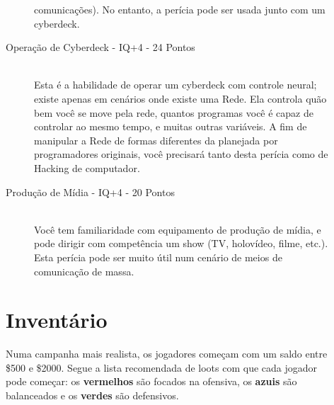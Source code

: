 \documentclass[a4paper]{article}
\begin{document}
\begin{description}
\begin{description}
comunicações). No entanto, a perícia pode ser usada junto com um cyberdeck.
    \item[Operação de Cyberdeck - IQ+4 - 24 Pontos] \hfill \\ Esta é a habilidade de operar um cyberdeck com controle
neural; existe apenas em cenários onde existe uma Rede. Ela
controla quão bem você se move pela rede, quantos programas
você é capaz de controlar ao mesmo tempo, e muitas outras
variáveis. A fim de manipular a Rede de formas diferentes da planejada
por programadores originais, você precisará tanto desta perícia
como de Hacking de computador.
    \item[Produção de Mídia - IQ+4 - 20 Pontos] \hfill \\ Você tem familiaridade com equipamento de produção de mídia, e pode dirigir com competência um show (TV, holovídeo, filme, etc.). Esta perícia pode ser muito útil num cenário de meios de comunicação de massa.
    


\end{description}

\section{Inventário}

Numa campanha mais realista, os jogadores começam com um saldo entre \$500 e \$2000. Segue a lista recomendada de loots com que cada jogador pode começar: os \textbf{vermelhos} são focados na ofensiva, os \textbf{azuis} são balanceados e os \textbf{verdes} são defensivos.\\


\end{description}
\end{document}
